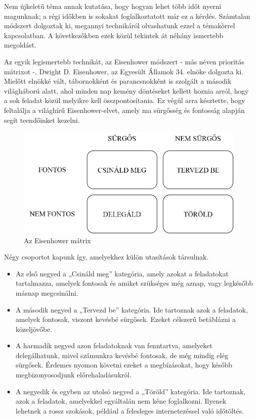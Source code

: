 
Nem újkeletű téma annak kutatása, hogy hogyan lehet több időt nyerni magunknak; a régi időkben is sokakat foglalkoztatott már ez a kérdés. Számtalan módszert dolgoztak ki, megannyi technikáról olvashatunk ezzel a témakörrel kapcsolatban. A következőkben ezek közül tekintek át néhány ismertebb megoldást.


Az egyik legismertebb technikát, az Eisenhower módszert - más néven prioritás mátrixot -, Dwight D. Eisenhower, az Egyesült Államok 34. elnöke dolgozta ki. Mielőtt elnökké vált, tábornokként és parancsnokként is szolgált a második világháború alatt, ahol minden nap kemény döntéseket kellett hoznia arról, hogy a sok feladat közül melyikre kell összpontosítania. Ez végül arra késztette, hogy feltalálja a világhírű Eisenhower-elvet, amely ma sürgősség és fontosság alapján segít teendőinket kezelni.

\begin{figure}[h]
	\centering
	\includegraphics[scale=0.7]{images/eisenhower.png}
	\caption{Az Eisenhower mátrix}
\end{figure}

Négy csoportot kapunk így, amelyekhez külön utasítások társulnak.

\begin{itemize}
\item Az első negyed a „Csináld meg” kategória, amely azokat a feladatokat tartalmazza, amelyek fontosak és amiket szükséges még aznap, vagy legkésőbb másnap megcsinálni.
\item A második negyed a „Tervezd be” kategória. Ide tartoznak azok a feladatok, amelyek fontosak, viszont kevésbé sürgősek. Ezeket célszerű betáblázni a közeljövőbe.
\item A harmadik negyed azon feladatoknak van fenntartva, amelyeket delegálhatunk, mivel számunkra kevésbé fontosak, de még mindig elég sürgősek. Érdemes nyomon követni ezeket a megbízásokat, hogy később megbizonyosodjunk előrehaladásukról.
\item A negyedik és egyben az utolsó negyed a „Töröld” kategória. Ide tartoznak, azok a feladatok, amelyekkel egyáltalán nem kéne foglalkozni. Ilyenek lehetnek a rossz szokások, például a felesleges internetezéssel való időtöltés.\cite{matrix}
\end{itemize}
 
